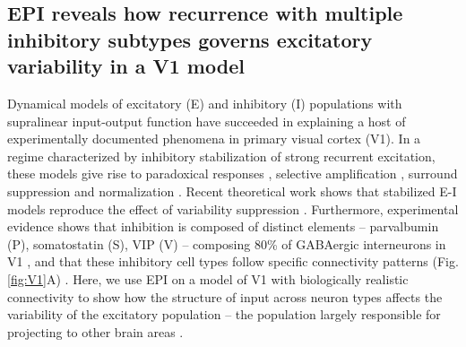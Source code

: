 \documentclass[11pt]{article}
\begin{document}
\subsection{EPI reveals how recurrence with multiple inhibitory subtypes governs excitatory variability in a V1 model} \label{results_V1}

Dynamical models of excitatory (E) and inhibitory (I) populations with supralinear input-output function have succeeded in explaining a host of experimentally documented phenomena in primary visual cortex (V1).
In a regime characterized by inhibitory stabilization of strong recurrent excitation, these models give rise to paradoxical responses \cite{tsodyks1997paradoxical}, selective amplification  \cite{goldman2009memory, murphy2009balanced}, surround suppression \cite{ozeki2009inhibitory} and normalization \cite{rubin2015stabilized}. 
Recent theoretical work \cite{hennequin2018dynamical} shows that stabilized E-I models reproduce the effect of variability suppression \cite{Churchland2010}. %
Furthermore, experimental evidence shows that inhibition is composed of distinct elements -- parvalbumin (P), somatostatin (S), VIP (V) --
composing 80\% of GABAergic interneurons in V1 \cite{markram2004interneurons, rudy2011three, tremblay2016}, and that these inhibitory cell types follow specific connectivity patterns (Fig. \ref{fig:V1}A) \cite{pfeffer2013inhibition}.
Here, we use EPI on a model of V1 with biologically realistic connectivity to show how the structure of input across neuron types affects the variability of the excitatory population -- the population largely responsible for projecting to other brain areas \cite{felleman1991distributed}.
\end{document}
